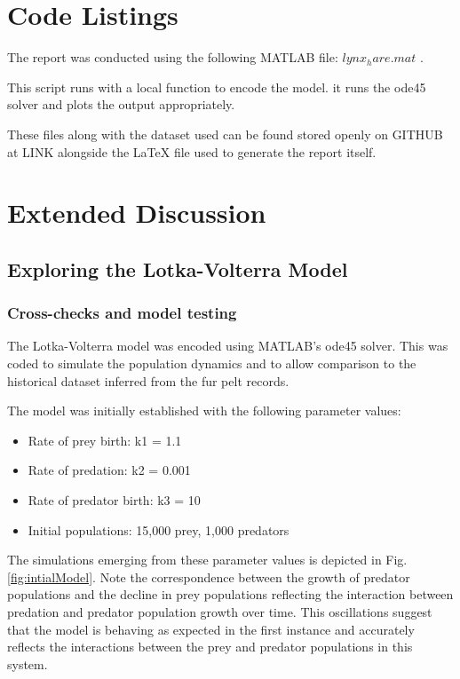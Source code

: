 \documentclass{article}
\begin{document}
\section{Code Listings}
The report was conducted using the following MATLAB file: $lynx_hare.mat$ .

This script runs with a local function to encode the model. it runs the ode45 solver and plots the output appropriately. 

These files along with the dataset used can be found stored openly on GITHUB at LINK alongside the LaTeX file used to generate the report itself. 

\section{Extended Discussion}
\subsection{Exploring the Lotka-Volterra Model}
\subsubsection{Cross-checks and model testing}
The Lotka-Volterra model was encoded using MATLAB's ode45 solver. This was coded to simulate the population dynamics and to allow comparison to the historical dataset inferred from the fur pelt records. 

The model was initially established with the following parameter values:
\begin{itemize}
     \item Rate of prey birth: k1 = 1.1
     \item Rate of predation: k2 = 0.001
     \item Rate of predator birth: k3 = 10
     \item Initial populations: 15,000 prey, 1,000 predators
   \end{itemize}

The simulations emerging from these parameter values is depicted in Fig. \ref{fig:intialModel}. Note the correspondence between the growth of predator populations and the decline in prey populations reflecting the interaction between predation and predator population growth over time. This oscillations suggest that the model is behaving as expected in the first instance and accurately reflects the interactions between the prey and predator populations in this system. 
\end{document}
